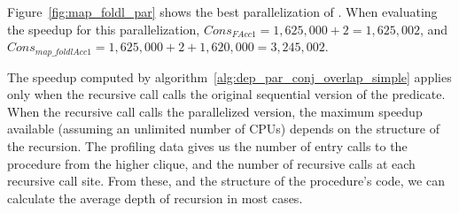Figure~\ref{fig:map_foldl_par} shows the best parallelization of
\mapfoldl.
When evaluating the speedup for this parallelization,
${Cons}_{{F} {Acc1}} = 1,625,000 + 2 = 1,625,002$, and
${Cons}_{{map\_foldl} {Acc1}} = 1,625,000 + 2 + 1,620,000 = 3,245,002$.

%

The speedup computed by algorithm~\ref{alg:dep_par_conj_overlap_simple}
applies only when the recursive call
calls the original sequential version of the predicate.
When the recursive call calls the parallelized version,
the maximum speedup available (assuming an unlimited number of CPUs)
depends on the structure of the recursion.
The profiling data gives us 
the number of entry calls to the procedure from the higher clique,
and  the number of recursive calls at each recursive call site.
From these, and the structure of the procedure's code,
we can calculate the average depth of recursion in most cases.

